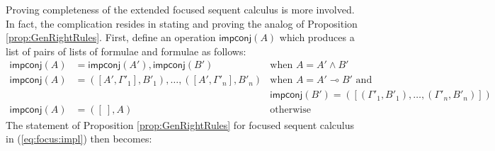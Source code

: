 \documentclass[submission,copyright,creativecommons]{eptcs}
\theoremstyle{definition}
\newcommand{\lolli}{\multimap}
\newcommand{\impconj}[1]{\mathsf{impconj} (#1)}
\newcommand{\proofbox}[1]{\begin{tabular}{l} #1 \end{tabular}}
\newcommand\niccolo[1]{\mbox{}
{\marginpar{\color{red}NV}}
{\sf\noindent\color{red}#1}}%
\begin{document}



Proving completeness of the extended focused sequent calculus is more involved. In fact, the complication resides in stating and proving the analog of Proposition \ref{prop:GenRightRules}. First, define an operation $\mathsf{impconj}(A)$ which produces a list of pairs of lists of formulae and formulae as follows: 
\begin{displaymath}
  \begin{array}{rll}
    \impconj{A} &= \impconj{A'} , \impconj{B'} &\text{when } A = A' \land B'
    \\
    \impconj{A} &= ([A' , \Gamma'_1] , B'_1) , \dots , ([A' , \Gamma'_n] , B'_n) &\text{when } A = A' \lolli B' \text{ and}
    \\
    & &\impconj{B'} = ([(\Gamma'_1 , B'_1) , \dots , (\Gamma'_n , B'_n)])
    \\
    \impconj{A} &= ([\ ] , A) &\text{otherwise}
  \end{array}
\end{displaymath}
The statement of Proposition \ref{prop:GenRightRules} for focused sequent calculus in (\ref{eq:focus:impl}) then becomes:
\end{document}
